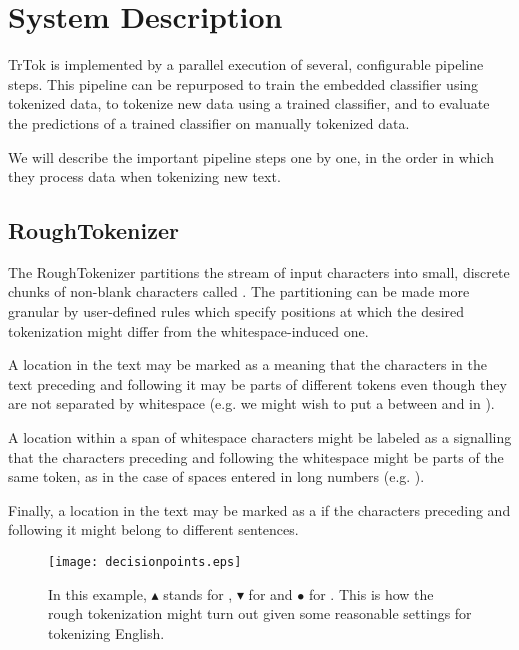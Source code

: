 \section{System Description}
\label{sec:system}

TrTok is implemented by a parallel execution of several, configurable
pipeline steps. This pipeline can be repurposed to train the embedded
classifier using tokenized data, to tokenize new data using a trained
classifier, and to evaluate the predictions of a trained classifier on
manually tokenized data.

We will describe the important pipeline steps one by one, in the order
in which they process data when tokenizing new text.

\subsection{RoughTokenizer}

The RoughTokenizer partitions the stream of input characters into
small, discrete chunks of non-blank characters called . The partitioning can be made more granular by user-defined
rules which specify positions at which the desired tokenization might
differ from the whitespace-induced one.

A location in the text may be marked as a \maysplit{} meaning that the
characters in the text preceding and following it may be parts of
different tokens even though they are not separated by whitespace
(e.g. we might wish to put a \maysplit{} between  and
 in ).

A location within a span of whitespace characters might be labeled as
a \mayjoin{} signalling that the characters preceding and following
the whitespace might be parts of the same token, as in the case of
spaces entered in long numbers (e.g. ).

Finally, a location in the text may be marked as a \maybreaksentence{}
if the characters preceding and following it might belong to different
sentences.

\begin{figure}
  \begin{center}
    \texttt{[image: decisionpoints.eps]}
    \caption{In this example, $\blacktriangle$ stands for \maysplit{},
      $\blacktriangledown$ for \mayjoin{} and $\bullet$ for
      \maybreaksentence{}. This is how the rough tokenization might
      turn out given some reasonable settings for tokenizing English.}
    \label{fig:decision-points}
  \end{center}
\end{figure}

